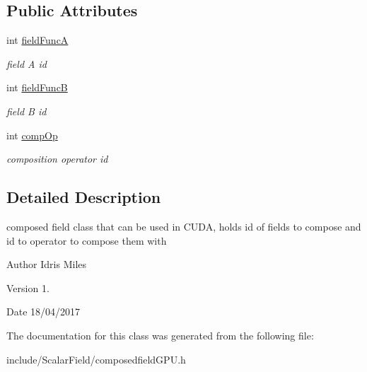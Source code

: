 \subsection*{Public Attributes}
\begin{DoxyCompactItemize}
\item 
int \hyperlink{classComposedFieldCuda_a9c679239d9de7e41a6c31c7b73c50532}{field\+FuncA}\hypertarget{classComposedFieldCuda_a9c679239d9de7e41a6c31c7b73c50532}{}\label{classComposedFieldCuda_a9c679239d9de7e41a6c31c7b73c50532}

\begin{DoxyCompactList}\small\item\em field A id \end{DoxyCompactList}\item 
int \hyperlink{classComposedFieldCuda_aa41c397a6de908083e890c5acce49755}{field\+FuncB}\hypertarget{classComposedFieldCuda_aa41c397a6de908083e890c5acce49755}{}\label{classComposedFieldCuda_aa41c397a6de908083e890c5acce49755}

\begin{DoxyCompactList}\small\item\em field B id \end{DoxyCompactList}\item 
int \hyperlink{classComposedFieldCuda_a62a02e83f861ae88ca296af687ef19ec}{comp\+Op}\hypertarget{classComposedFieldCuda_a62a02e83f861ae88ca296af687ef19ec}{}\label{classComposedFieldCuda_a62a02e83f861ae88ca296af687ef19ec}

\begin{DoxyCompactList}\small\item\em composition operator id \end{DoxyCompactList}\end{DoxyCompactItemize}


\subsection{Detailed Description}
composed field class that can be used in C\+U\+DA, holds id of fields to compose and id to operator to compose them with 

\begin{DoxyAuthor}{Author}
Idris Miles 
\end{DoxyAuthor}
\begin{DoxyVersion}{Version}
1. 
\end{DoxyVersion}
\begin{DoxyDate}{Date}
18/04/2017 
\end{DoxyDate}


The documentation for this class was generated from the following file\+:\begin{DoxyCompactItemize}
\item 
include/\+Scalar\+Field/composedfield\+G\+P\+U.\+h\end{DoxyCompactItemize}
